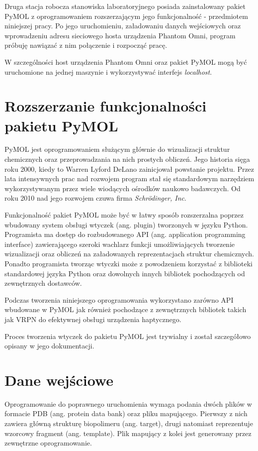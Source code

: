 \documentclass[licencjacka]{pracamgr}
\begin{document}
Druga stacja robocza stanowiska laboratoryjnego posiada zainstalowany pakiet PyMOL z oprogramowaniem rozszerzającym jego funkcjonalność - przedmiotem niniejszej pracy. Po jego uruchomieniu, załadowaniu danych wejściowych oraz wprowadzeniu adresu sieciowego hosta urządzenia Phantom Omni, program próbuję nawiązać z nim połączenie i rozpocząć pracę.

W szczególności host urządzenia Phantom Omni oraz pakiet PyMOL mogą być uruchomione na jednej maszynie i wykorzystywać interfejs \textit{localhost}.

\section{Rozszerzanie funkcjonalności pakietu PyMOL}

PyMOL jest oprogramowaniem służącym głównie do wizualizacji struktur chemicznych oraz przeprowadzania na nich prostych obliczeń. Jego historia sięga roku 2000, kiedy to Warren Lyford DeLano zainicjował powstanie projektu. Przez lata intensywnych prac nad rozwojem program stał się standardowym narzędziem wykorzystywanym przez wiele wiodących ośrodków naukowo badawczych. Od roku 2010 nad jego rozwojem czuwa firma \textit{Schrödinger, Inc}.

Funkcjonalność pakiet PyMOL może być w łatwy sposób rozszerzalna poprzez wbudowany system obsługi wtyczek (ang. plugin) tworzonych w języku Python. Programista ma dostęp do rozbudowanego API (ang. application programming interface) zawierającego szeroki wachlarz funkcji umożliwiających tworzenie wizualizacji oraz obliczeń na załadowanych reprezentacjach struktur chemicznych. Ponadto programista tworząc wtyczki może z powodzeniem korzystać z biblioteki standardowej języka Python oraz dowolnych innych bibliotek pochodzących od zewnętrznych dostawców.

Podczas tworzenia niniejszego oprogramowania wykorzystano zarówno API wbudowane w PyMOL jak również pochodzące z zewnętrznych bibliotek takich jak VRPN do efektywnej obsługi urządzenia haptycznego.

Proces tworzenia wtyczek do pakietu PyMOL jest trywialny i został szczegółowo opisany w jego dokumentacji. 

\section{Dane wejściowe}
Oprogramowanie do poprawnego uruchomienia wymaga podania dwóch plików w formacie PDB (ang. protein data bank) oraz pliku mapującego. Pierwszy z nich zawiera główną strukturę biopolimeru (ang. target), drugi natomiast reprezentuje wzorcowy fragment (ang. template). Plik mapujący z kolei jest generowany przez zewnętrzne oprogramowanie.
\end{document}
